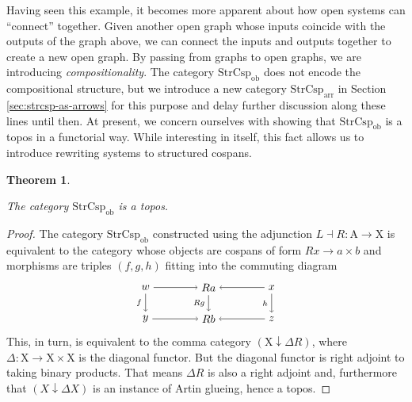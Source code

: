 \documentclass{amsart}
\newcommand{\ob}{_{ \text{ob} }}
\newcommand{\arr}{_{ \text{arr} }}
\newcommand{\A}{\cat{A}}
\newcommand{\X}{\cat{X}}
\newcommand{\StrCsp}{\cat{StrCsp}}
\newcommand{\cat}[1]{\mathrm{#1}}
\newcommand{\from}{\colon}
\newcommand{\csp}[3]{#2 \to #1 \times #3}
\newtheorem{theorem}{Theorem}[section]
\theoremstyle{remark}
\theoremstyle{definition}
\begin{document}

Having seen this example, it becomes more apparent about how open
systems can ``connect'' together. Given another open graph whose inputs
coincide with the outputs of the graph above, we can connect
the inputs and outputs together to create a new open graph. By passing
from graphs to open graphs, we are introducing
\emph{compositionality}. The category $ \StrCsp\ob $ does not encode
the compositional structure, but we introduce a new category
$ \StrCsp\arr $ in Section \ref{sec:strcsp-as-arrows} for this purpose
and delay further discussion along these lines until then. At present,
we concern ourselves with showing that $ \StrCsp\ob $ is a topos in a
functorial way.  While interesting in itself, this fact allows us to
introduce rewriting systems to structured cospans.


\begin{theorem} \label{thm:strcsp-istopos}

  The category $ \StrCsp\ob $ is a topos.
  
\end{theorem}

\begin{proof}

  The category $ \StrCsp\ob $ constructed using the adjunction
  $ L \dashv R \from \A \to \X $ is equivalent to the category
  whose objects are cospans of form
  \(
      \csp{a}{Rx}{b}
  \)
  and morphisms are triples $ ( f,g,h ) $ fitting into the commuting
  diagram
  \[
    \begin{tikzpicture}
      \node (1) at (-2,1) {\( w \)};
      \node (2) at (0,1) {\( Ra \)};
      \node (3) at (2,1) {\( x \)};
      \node (4) at (-2,0) {\( y \)};
      \node (5) at (0,0) {\( Rb \)};
      \node (6) at (2,0) {\( z \)};
      \draw [->] (1) to  node [] {\scriptsize{\(  \)}} (2);
      \draw [->] (3) to node [] {\scriptsize{\(  \)}} (2);
      \draw [->] (4) to node [] {\scriptsize{\(  \)}} (5);
      \draw [->] (6) to node [] {\scriptsize{\(  \)}} (5);
      \draw [->] (1) to node [left] {\scriptsize{\( f \)}} (4);
      \draw [->] (2) to node [left] {\scriptsize{\( Rg \)}} (5);
      \draw [->] (3) to node [left] {\scriptsize{\( h \)}} (6); 
    \end{tikzpicture}
  \]
  This, in turn, is equivalent to the comma category
  $ ( \X \downarrow \Delta R ) $, where
  $ \Delta \from \X \to \X \times \X $ is the diagonal functor. But
  the diagonal functor is right adjoint to taking binary
  products. That means $ \Delta R $ is also a right adjoint and,
  furthermore that $ ( X \downarrow \Delta X ) $ is an instance of
  Artin glueing,
   hence a topos.

\end{proof}
\end{document}
